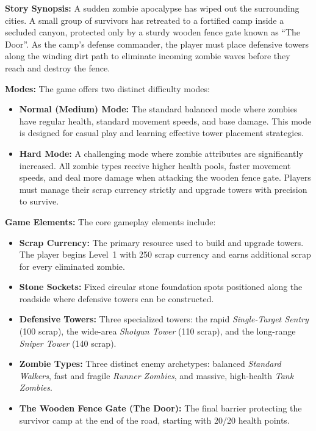 \textbf{Story Synopsis:} A sudden zombie apocalypse has wiped out the surrounding cities. A small group of survivors has retreated to a fortified camp inside a secluded canyon, protected only by a sturdy wooden fence gate known as ``The Door''. As the camp's defense commander, the player must place defensive towers along the winding dirt path to eliminate incoming zombie waves before they reach and destroy the fence.

\textbf{Modes:} The game offers two distinct difficulty modes:
\begin{itemize}[label=\textbullet]
  \item \textbf{Normal (Medium) Mode:} The standard balanced mode where zombies have regular health, standard movement speeds, and base damage. This mode is designed for casual play and learning effective tower placement strategies.
  \item \textbf{Hard Mode:} A challenging mode where zombie attributes are significantly increased. All zombie types receive higher health pools, faster movement speeds, and deal more damage when attacking the wooden fence gate. Players must manage their scrap currency strictly and upgrade towers with precision to survive.
\end{itemize}

\textbf{Game Elements:} The core gameplay elements include:
\begin{itemize}[label=\textbullet]
  \item \textbf{Scrap Currency:} The primary resource used to build and upgrade towers. The player begins Level~1 with 250 scrap currency and earns additional scrap for every eliminated zombie.
  \item \textbf{Stone Sockets:} Fixed circular stone foundation spots positioned along the roadside where defensive towers can be constructed.
  \item \textbf{Defensive Towers:} Three specialized towers: the rapid \textit{Single-Target Sentry} (100 scrap), the wide-area \textit{Shotgun Tower} (110 scrap), and the long-range \textit{Sniper Tower} (140 scrap).
  \item \textbf{Zombie Types:} Three distinct enemy archetypes: balanced \textit{Standard Walkers}, fast and fragile \textit{Runner Zombies}, and massive, high-health \textit{Tank Zombies}.
  \item \textbf{The Wooden Fence Gate (The Door):} The final barrier protecting the survivor camp at the end of the road, starting with 20/20 health points.
\end{itemize}

